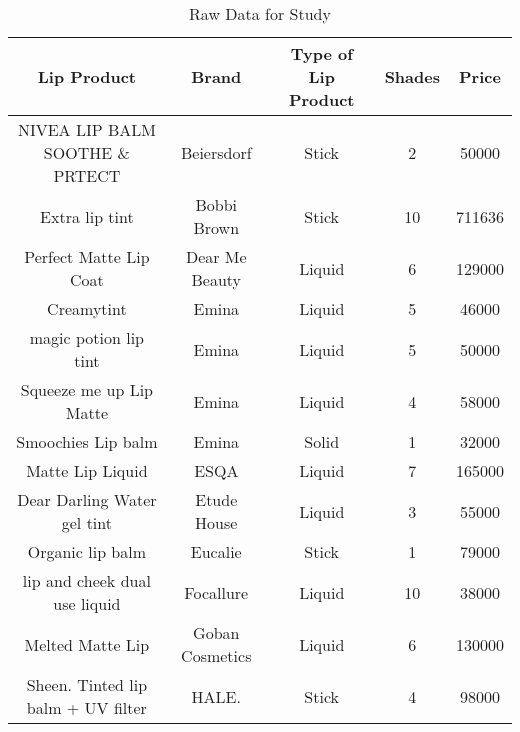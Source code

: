 
\begin{table}[htbp]
    \centering
    \caption{Raw Data for Study}
    \label{tab:Table_Raw}
    \begin{tabular}{ccccc}        \hline
        \textbf{Lip Product}                    & \textbf{Brand}    & \textbf{Type of Lip Product} & \textbf{Shades} & \textbf{Price} \\ \hline
        NIVEA LIP BALM SOOTHE \& PRTECT         & Beiersdorf        & Stick                        & 2               & 50000          \\
        Extra lip tint                          & Bobbi Brown       & Stick                        & 10              & 711636         \\
        Perfect Matte Lip Coat                  & Dear Me Beauty    & Liquid                       & 6               & 129000         \\
        Creamytint                              & Emina             & Liquid                       & 5               & 46000          \\
        magic potion lip tint                   & Emina             & Liquid                       & 5               & 50000          \\
        Squeeze me up Lip Matte                 & Emina             & Liquid                       & 4               & 58000          \\
        Smoochies Lip balm                      & Emina             & Solid                        & 1               & 32000          \\
        Matte Lip Liquid                        & ESQA              & Liquid                       & 7               & 165000         \\
        Dear Darling Water gel tint             & Etude House       & Liquid                       & 3               & 55000          \\
        Organic lip balm                        & Eucalie           & Stick                        & 1               & 79000          \\
        lip and cheek dual use liquid           & Focallure         & Liquid                       & 10              & 38000          \\
        Melted Matte Lip                        & Goban Cosmetics   & Liquid                       & 6               & 130000         \\
        Sheen. Tinted lip balm + UV filter      & HALE.             & Stick                        & 4               & 98000          \\

\end{tabular}
\end{table}
